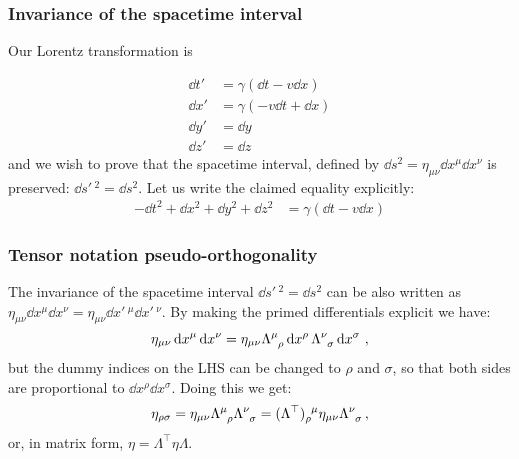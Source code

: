 \documentclass[main.tex]{subfiles}
\begin{document}
\subsubsection{Invariance of the spacetime interval}

Our Lorentz transformation is

\begin{subequations}
\begin{align}
    \dd{t}' &= \gamma (\dd{t} - v \dd{x}) \\
    \dd{x}' &= \gamma (-v\dd{t} + \dd{x}) \\
    \dd{y}' &= \dd{y} \\
    \dd{z}' &= \dd{z}
\end{align}
\end{subequations}
%
and we wish to prove that the spacetime interval, defined by $\dd{s^2} = \eta_{\mu\nu} \dd{x^\mu}\dd{x^\nu}$ is preserved: $\dd{s'\,^2} = \dd{s^2}$.
Let us write the claimed equality explicitly:
%
\begin{subequations}
\begin{align}
    -\dd{t^2} + \dd{x^2}+ \dd{y^2}+ \dd{z^2}
    &= \gamma (\dd{t} - v \dd{x})
\end{align}
\end{subequations}


\subsubsection{Tensor notation pseudo-orthogonality}

The invariance of the spacetime interval $\dd{s'\,^2} = \dd{s^2}$ can be also written as \(\eta_{\mu\nu} \dd{x^\mu} \dd{x^\nu} = \eta_{\mu\nu} \dd{x'\,^\mu} \dd{x'\,^\nu}\). By making the primed differentials explicit we have:
%
\begin{equation}
  \eta_{\mu\nu} \dd{x^\mu} \dd{x^\nu}
  =
  \eta_{\mu\nu} \tensor{\Lambda}{^\mu_\rho} \dd{x^\rho} \tensor{\Lambda}{^\nu_\sigma} \dd{x^\sigma} \,,
\end{equation}
%
but the dummy indices on the LHS can be changed to \(\rho\) and \(\sigma\), so that both sides are proportional to  \(\dd{x^\rho}\dd{x^\sigma}\). Doing this we get:
%
\begin{equation}
  \eta_{\rho\sigma}
  =
  \eta_{\mu\nu} \tensor{\Lambda}{^\mu_\rho} \tensor{\Lambda}{^\nu_\sigma}
  =\tensor{(\Lambda^\top)}{_\rho^\mu} \eta_{\mu\nu} \tensor{\Lambda}{^\nu_\sigma} \,,
\end{equation}
%
or, in matrix form, \(\eta = \Lambda^\top \eta \Lambda\).
\end{document}
